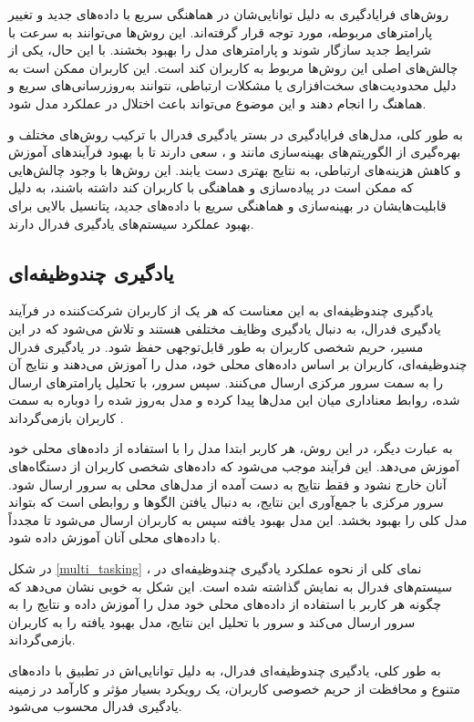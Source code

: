 روش‌های فرایادگیری به دلیل توانایی‌شان در هماهنگی سریع با داده‌های جدید و تغییر پارامترهای مربوطه، مورد توجه قرار گرفته‌اند. این روش‌ها می‌توانند به سرعت با شرایط جدید سازگار شوند و پارامترهای مدل را بهبود بخشند. با این حال، یکی از چالش‌های اصلی این روش‌ها مربوط به کاربران کند است. این کاربران ممکن است به دلیل محدودیت‌های سخت‌افزاری یا مشکلات ارتباطی، نتوانند به‌روزرسانی‌های سریع و هماهنگ را انجام دهند و این موضوع می‌تواند باعث اختلال در عملکرد مدل شود.

به طور کلی، مدل‌های فرایادگیری در بستر یادگیری فدرال با ترکیب روش‌های مختلف و بهره‌گیری از الگوریتم‌های بهینه‌سازی مانند
و
%
، سعی دارند تا با بهبود فرآیندهای آموزش و کاهش هزینه‌های ارتباطی، به نتایج بهتری دست یابند. این روش‌ها با وجود چالش‌هایی که ممکن است در پیاده‌سازی و هماهنگی با کاربران کند داشته باشند، به دلیل قابلیت‌هایشان در بهینه‌سازی و هماهنگی سریع با داده‌های جدید، پتانسیل بالایی برای بهبود عملکرد سیستم‌های یادگیری فدرال دارند.

\subsection{یادگیری چندوظیفه‌ای}
یادگیری چندوظیفه‌ای به این معناست که هر یک از کاربران شرکت‌کننده در فرآیند یادگیری فدرال، به دنبال یادگیری وظایف مختلفی هستند و تلاش می‌شود که در این مسیر، حریم شخصی کاربران به طور قابل‌توجهی حفظ شود. در یادگیری فدرال چندوظیفه‌ای، کاربران بر اساس داده‌های محلی خود، مدل را آموزش می‌دهند و نتایج آن را به سمت سرور مرکزی ارسال می‌کنند. سپس سرور، با تحلیل پارامترهای ارسال شده، روابط معناداری میان این مدل‌ها پیدا کرده و مدل به‌روز شده را دوباره به سمت کاربران بازمی‌گرداند
\cite{corinzia2019variational}.

به عبارت دیگر، در این روش، هر کاربر ابتدا مدل را با استفاده از داده‌های محلی خود آموزش می‌دهد. این فرآیند موجب می‌شود که داده‌های شخصی کاربران از دستگاه‌های آنان خارج نشود و فقط نتایج به دست آمده از مدل‌های محلی به سرور ارسال شود. سرور مرکزی با جمع‌آوری این نتایج، به دنبال یافتن الگوها و روابطی است که بتواند مدل کلی را بهبود بخشد. این مدل بهبود یافته سپس به کاربران ارسال می‌شود تا مجدداً با داده‌های محلی آنان آموزش داده شود.

در شکل
\ref{multi_tasking}%
، نمای کلی از نحوه عملکرد یادگیری چندوظیفه‌ای در سیستم‌های فدرال به نمایش گذاشته شده است. این شکل به خوبی نشان می‌دهد که چگونه هر کاربر با استفاده از داده‌های محلی خود مدل را آموزش داده و نتایج را به سرور ارسال می‌کند و سرور با تحلیل این نتایج، مدل بهبود یافته را به کاربران بازمی‌گرداند.

به طور کلی، یادگیری چندوظیفه‌ای فدرال، به دلیل توانایی‌اش در تطبیق با داده‌های متنوع و محافظت از حریم خصوصی کاربران، یک رویکرد بسیار مؤثر و کارآمد در زمینه یادگیری فدرال محسوب می‌شود.

